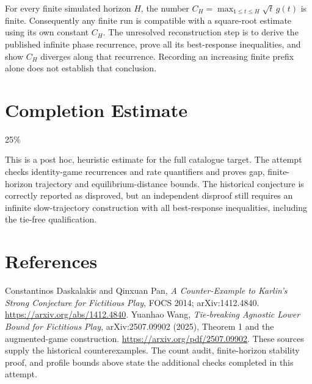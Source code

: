 \documentclass[11pt]{article}
\begin{document}
For every finite simulated horizon $H$, the number
$C_H=\max_{1\leq t\leq H}\sqrt t\,g(t)$ is finite. Consequently any
finite run is compatible with a square-root estimate using its own
constant $C_H$. The unresolved reconstruction step is to derive the
published infinite phase recurrence, prove all its best-response
inequalities, and show $C_H$ diverges along that recurrence. Recording
an increasing finite prefix alone does not establish that conclusion.

\section{Completion Estimate}
25\%

This is a post hoc, heuristic estimate for the full catalogue target.
The attempt checks identity-game recurrences and rate quantifiers and proves gap, finite-horizon trajectory and equilibrium-distance bounds. The historical conjecture is correctly reported as disproved, but an independent disproof still requires an infinite slow-trajectory construction with all best-response inequalities, including the tie-free qualification.

\section*{References}
Constantinos Daskalakis and Qinxuan Pan,
\emph{A Counter-Example to Karlin's Strong Conjecture for Fictitious Play},
FOCS 2014; arXiv:1412.4840.
\url{https://arxiv.org/abs/1412.4840}.
Yuanhao Wang, \emph{Tie-breaking Agnostic Lower Bound for Fictitious Play},
arXiv:2507.09902 (2025), Theorem 1 and the augmented-game construction.
\url{https://arxiv.org/pdf/2507.09902}.
These sources supply the historical counterexamples. The count audit,
finite-horizon stability proof, and profile bounds above state the
additional checks completed in this attempt.
\end{document}
